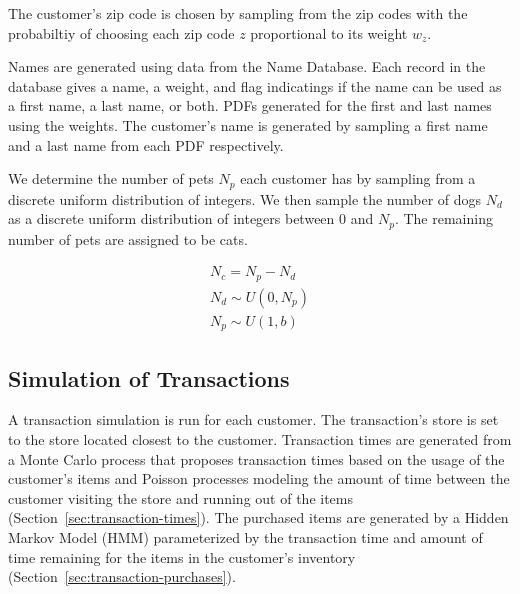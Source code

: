\documentclass[conference]{IEEEtran}
\begin{document}
The customer's zip code is chosen by sampling from the zip codes with the probabiltiy of choosing each zip code $z$ proportional to its weight $w_z$.

Names are generated using data from the Name Database\cite{NameDB}. Each record in the database gives a name, a weight, and flag indicatings if the name can be used as a first name, a last name, or both.  PDFs generated for the first and last names using the weights.  The customer's name is generated by sampling a first name and a last name from each PDF respectively.

We determine the number of pets $N_p$ each customer has by sampling from a discrete uniform distribution of integers. We then sample the number of dogs $N_d$ as a discrete uniform distribution of integers between 0 and $N_p$.  The remaining number of pets are assigned to be cats.

\begin{align*}
N_c = N_p - N_d \\
N_d \sim U(0, N_p) \\
N_p \sim U(1, b)
\end{align*}

\subsection{Simulation of Transactions}
A transaction simulation is run for each customer. The transaction's store is set to the store located closest to the customer.  Transaction times are generated from a Monte Carlo process that proposes transaction times based on the usage of the customer's items and Poisson processes modeling the amount of time between the customer visiting the store and running out of the items (Section~\ref{sec:transaction-times}).  The purchased items are generated by a Hidden Markov Model (HMM) parameterized by the transaction time and amount of time remaining for the items in the customer's inventory (Section~\ref{sec:transaction-purchases}).
\end{document}
